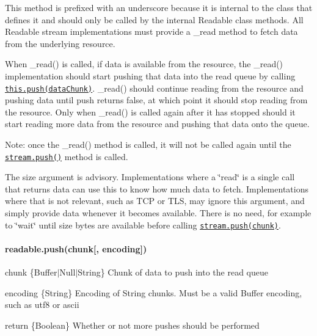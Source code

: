 This method is prefixed with an underscore because it is internal to the class that defines it and should only be called by the internal Readable class methods. All Readable stream implementations must provide a \+\_\+read method to fetch data from the underlying resource.

When {\ttfamily \+\_\+read()} is called, if data is available from the resource, the {\ttfamily \+\_\+read()} implementation should start pushing that data into the read queue by calling \href{#stream_readable_push_chunk_encoding}{\tt {\ttfamily this.\+push(data\+Chunk)}}. {\ttfamily \+\_\+read()} should continue reading from the resource and pushing data until push returns {\ttfamily false}, at which point it should stop reading from the resource. Only when {\ttfamily \+\_\+read()} is called again after it has stopped should it start reading more data from the resource and pushing that data onto the queue.

Note\+: once the {\ttfamily \+\_\+read()} method is called, it will not be called again until the \href{#stream_readable_push_chunk_encoding}{\tt {\ttfamily stream.\+push()}} method is called.

The {\ttfamily size} argument is advisory. Implementations where a \char`\"{}read\char`\"{} is a single call that returns data can use this to know how much data to fetch. Implementations where that is not relevant, such as T\+CP or T\+LS, may ignore this argument, and simply provide data whenever it becomes available. There is no need, for example to \char`\"{}wait\char`\"{} until {\ttfamily size} bytes are available before calling \href{#stream_readable_push_chunk_encoding}{\tt {\ttfamily stream.\+push(chunk)}}.

\paragraph*{readable.\+push(chunk\mbox{[}, encoding\mbox{]})}


\begin{DoxyItemize}
\item {\ttfamily chunk} \{Buffer$\vert$\+Null$\vert$\+String\} Chunk of data to push into the read queue
\item {\ttfamily encoding} \{String\} Encoding of String chunks. Must be a valid Buffer encoding, such as {\ttfamily \textquotesingle{}utf8\textquotesingle{}} or {\ttfamily \textquotesingle{}ascii\textquotesingle{}}
\item return \{Boolean\} Whether or not more pushes should be performed
\end{DoxyItemize}

